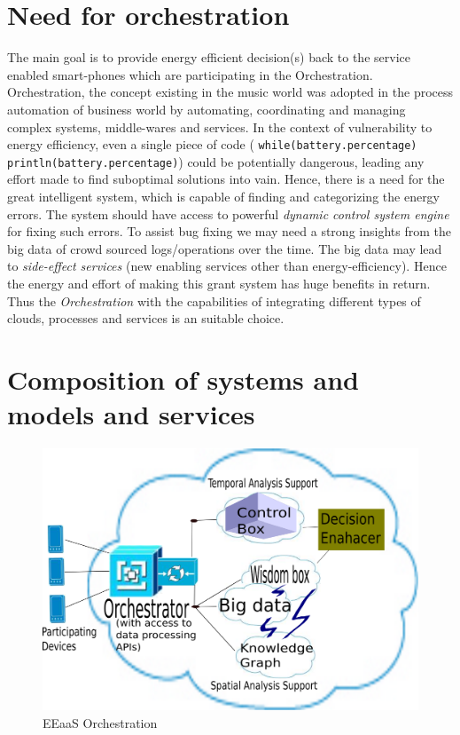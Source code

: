 \section{Need for orchestration}
The main goal is to provide energy efficient decision(s) back to the service enabled smart-phones which are participating in the Orchestration. Orchestration, the concept existing in the music world was adopted in the process automation of business world by automating, coordinating and managing complex systems, middle-wares and services. In the context of vulnerability to energy efficiency, even a single piece of code  ( {\tt while(battery.percentage) println(battery.percentage)}) could be potentially dangerous, leading any effort made to find suboptimal solutions into vain. Hence, there is a need for the great intelligent system, which is capable of finding and categorizing the energy errors. The system should have access to powerful \textit{dynamic control system engine} for fixing such errors. To assist bug fixing we may need a strong insights from the big data of crowd sourced logs/operations  over the time. The big data may lead to \emph{side-effect services} (new enabling services other than energy-efficiency). Hence the energy and effort of making this grant system has huge benefits in return. Thus the \emph{Orchestration}  with the capabilities of integrating different types of clouds, processes and services is an suitable choice. 

\section{Composition of systems and models and services}
\begin{figure}[h]
	\begin{center}
		\includegraphics[scale=0.30]{Figures/EEaaOSArchEnhanced.png}
		\end{center}
		\caption{EEaaS Orchestration}
		\label{fig:Orch}
		\end{figure}
		
